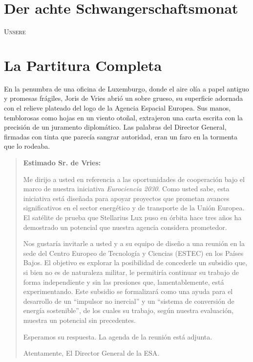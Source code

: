 

\chapter*{Der achte Schwangerschaftsmonat}

\lettrine[lines=2, loversize=0.3, lraise=0]{\initfamily U}{nsere}

\chapter{La Partitura Completa}
\label{cap:partitura-completa}

En la penumbra de una oficina de Luxemburgo, donde el aire olía a papel antiguo y promesas frágiles, Joris de Vries abrió un sobre grueso, su superficie adornada con el relieve plateado del logo de la Agencia Espacial Europea. Sus manos, temblorosas como hojas en un viento otoñal, extrajeron una carta escrita con la precisión de un juramento diplomático. Las palabras del Director General, firmadas con tinta que parecía sangrar autoridad, eran un faro en la tormenta que lo rodeaba.

\begin{quote}
    \textbf{Estimado Sr. de Vries:}
    \vspace{0.5em}

    Me dirijo a usted en referencia a las oportunidades de cooperación bajo el marco de nuestra iniciativa \emph{Eurociencia 2030}. Como usted sabe, esta iniciativa está diseñada para apoyar proyectos que prometan avances significativos en el sector energético y de transporte de la Unión Europea. El satélite de prueba que Stellarius Lux puso en órbita hace tres años ha demostrado un potencial que nuestra agencia considera prometedor.
    \vspace{0.5em}

    Nos gustaría invitarle a usted y a su equipo de diseño a una reunión en la sede del Centro Europeo de Tecnología y Ciencias (ESTEC) en los Países Bajos. El objetivo es explorar la posibilidad de concederle un subsidio que, si bien no es de naturaleza militar, le permitiría continuar su trabajo de forma independiente y sin las presiones que, lamentablemente, está experimentando. Este subsidio se formalizará como una ayuda para el desarrollo de un “impulsor no inercial” y un “sistema de conversión de energía sostenible”, de los cuales su trabajo, según nuestra evaluación, muestra un potencial sin precedentes.
    \vspace{0.5em}

    Esperamos su respuesta. La agenda de la reunión está adjunta.
    \vspace{0.5em}

    Atentamente, \quad
    El Director General de la ESA.
\end{quote}

